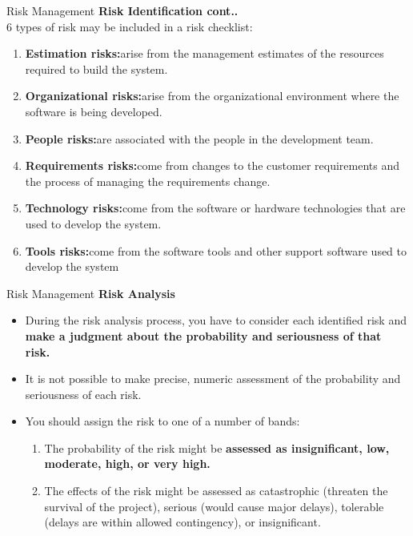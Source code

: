\documentclass{beamer}
\begin{document}
\begin{frame}{Risk Management}
	\textbf{Risk Identification cont..}\\6 types of risk may be included in a risk checklist:

	\begin{enumerate}
		\item \textbf{Estimation risks:}arise from the management estimates of the resources 
		required to build the system. 
		\item \textbf{Organizational risks:}arise from the organizational environment where 
		the software is being developed.
		\item \textbf{People risks:}are associated with the people in the development team. 
		\item \textbf{Requirements risks:}come from changes to the customer requirements 
		and the process of managing the requirements change.
		\item \textbf{Technology risks:}come from the software or hardware technologies that 
		are used to develop the system.
		\item \textbf{Tools risks:}come from the software tools and other support software 
		used to develop the system
	\end{enumerate}
\end{frame}
\begin{frame}{Risk Management}
	\textbf{Risk Analysis}
	\begin{itemize}
		\item During the risk analysis process, you have to consider each identified risk and \textbf{make a 
			judgment about the probability and seriousness of that risk. }
		\item It is not possible to make precise, numeric assessment of the probability and seriousness 
		of each risk.

		\item You should assign the risk to one of a number of bands:
		\begin{enumerate}
			\item The probability of the risk might be \textbf{assessed as insignificant, low, moderate, high, or very high. }
			\item The effects of the risk might be assessed as catastrophic (threaten the survival of the project), 
			serious (would cause major delays), tolerable (delays are within allowed contingency), or 
			insignificant.
		\end{enumerate}
	\end{itemize}
\end{frame}
\end{document}
